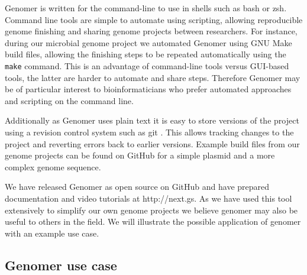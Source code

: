 \documentclass[10pt]{article}
\begin{document}
Genomer is written for the command-line to use in shells such as bash or zsh.
Command line tools are simple to automate using scripting, allowing
reproducible genome finishing and sharing genome projects between researchers.
For instance, during our microbial genome project we automated Genomer using
GNU Make build files, allowing the finishing steps to be repeated automatically
using the \verb+make+ command. This is an advantage of command-line tools
versus GUI-based tools, the latter are harder to automate and share steps.
Therefore Genomer may be of particular interest to bioinformaticians who prefer
automated approaches and scripting on the command line.

Additionally as Genomer uses plain text it is easy to store versions of the
project using a revision control system such as git \cite{git-scm}. This allows
tracking changes to the project and reverting errors back to earlier versions.
Example build files from our genome projects can be found on GitHub for a
simple plasmid \cite{plasmid-github} and a more complex genome
\cite{genome-github} sequence.

We have released Genomer as open source on GitHub \cite{genomer-github} and
have prepared documentation and video tutorials at http://next.gs. As we have
used this tool extensively to simplify our own genome projects we believe
genomer may also be useful to others in the field. We will illustrate the
possible application of genomer with an example use case.

\subsection*{Genomer use case}
\end{document}
